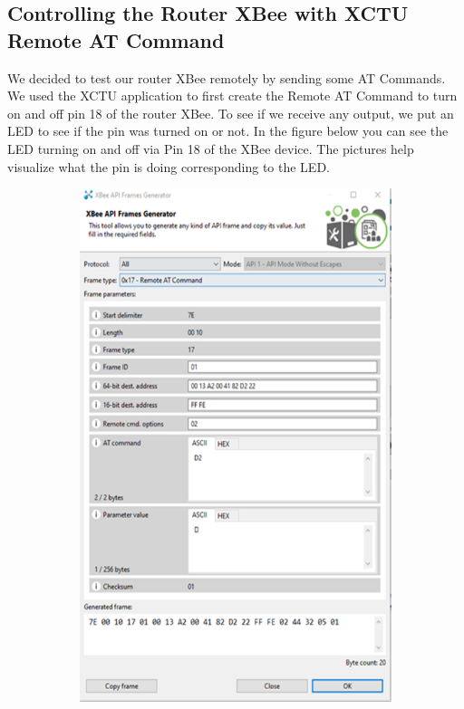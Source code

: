 \documentclass[letter,twocolumn]{report}
\begin{document}
	\subsection{Controlling the Router XBee with XCTU Remote AT Command}
	\par We decided to test our router XBee remotely by sending some AT Commands. We used the XCTU application to first create the Remote AT Command to turn on and off pin 18 of the router XBee. To see if we receive any output, we put an LED to see if the pin was turned on or not. In the figure below you can see the LED turning on and off via Pin 18 of the XBee device. The pictures help visualize what the pin is doing corresponding to the LED.
	\begin{figure}[h!]
		\centering
		\begin{subfigure}[t]{0.22\textwidth}
			\centering
			\includegraphics[width=\textwidth]{xbeeXctu1.png}

\end{subfigure}
\end{figure}
\end{document}
